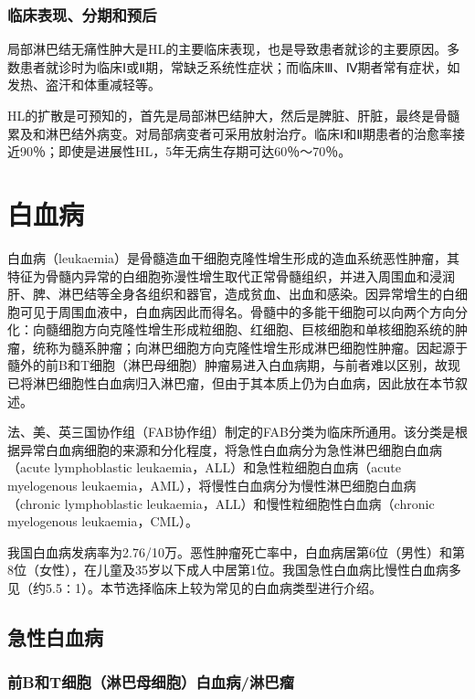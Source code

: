 \subsubsection{临床表现、分期和预后}

局部淋巴结无痛性肿大是HL的主要临床表现，也是导致患者就诊的主要原因。多数患者就诊时为临床Ⅰ或Ⅱ期，常缺乏系统性症状；而临床Ⅲ、Ⅳ期者常有症状，如发热、盗汗和体重减轻等。

HL的扩散是可预知的，首先是局部淋巴结肿大，然后是脾脏、肝脏，最终是骨髓累及和淋巴结外病变。对局部病变者可采用放射治疗。临床Ⅰ和Ⅱ期患者的治愈率接近90％；即使是进展性HL，5年无病生存期可达60％～70％。

\section{白血病}

白血病（leukaemia）是骨髓造血干细胞克隆性增生形成的造血系统恶性肿瘤，其特征为骨髓内异常的白细胞弥漫性增生取代正常骨髓组织，并进入周围血和浸润肝、脾、淋巴结等全身各组织和器官，造成贫血、出血和感染。因异常增生的白细胞可见于周围血液中，白血病因此而得名。骨髓中的多能干细胞可以向两个方向分化：向髓细胞方向克隆性增生形成粒细胞、红细胞、巨核细胞和单核细胞系统的肿瘤，统称为髓系肿瘤；向淋巴细胞方向克隆性增生形成淋巴细胞性肿瘤。因起源于髓外的前B和T细胞（淋巴母细胞）肿瘤易进入白血病期，与前者难以区别，故现已将淋巴细胞性白血病归入淋巴瘤，但由于其本质上仍为白血病，因此放在本节叙述。

法、美、英三国协作组（FAB协作组）制定的FAB分类为临床所通用。该分类是根据异常白血病细胞的来源和分化程度，将急性白血病分为急性淋巴细胞白血病（acute
lymphoblastic leukaemia，ALL）和急性粒细胞白血病（acute myelogenous
leukaemia，AML），将慢性白血病分为慢性淋巴细胞白血病（chronic
lymphoblastic leukaemia，ALL）和慢性粒细胞性白血病（chronic myelogenous
leukaemia，CML）。

我国白血病发病率为2.76/10万。恶性肿瘤死亡率中，白血病居第6位（男性）和第8位（女性），在儿童及35岁以下成人中居第1位。我国急性白血病比慢性白血病多见（约5.5∶1）。本节选择临床上较为常见的白血病类型进行介绍。

\subsection{急性白血病}

\subsubsection{前B和T细胞（淋巴母细胞）白血病/淋巴瘤}

